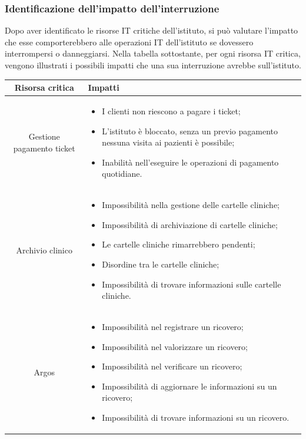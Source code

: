 \documentclass[12pt, a4paper, titlepage]{report}
\begin{document}
		\subsubsection{Identificazione dell'impatto dell'interruzione}
		
		Dopo aver identificato le risorse IT critiche dell'istituto, si può valutare l'impatto che esse comporterebbero alle operazioni IT dell'istituto se dovessero interrompersi o danneggiarsi. Nella tabella sottostante, per ogni risorsa IT critica, vengono illustrati i possibili impatti che una sua interruzione avrebbe sull'istituto.
		\newpage
		\begin{longtable}{| c | p{10cm} |}
				\hline
				\textbf{Risorsa critica} & \textbf{Impatti} \\ \hline
				Gestione pagamento ticket & \begin{itemize} \item I clienti non riescono a pagare i ticket;	\item L'istituto è bloccato, senza un previo pagamento nessuna visita ai pazienti è possibile; \item Inabilità nell'eseguire le operazioni di pagamento quotidiane.\end{itemize}\\ \hline
				Archivio clinico & \begin{itemize} \item Impossibilità nella gestione delle cartelle cliniche; \item Impossibilità di archiviazione di cartelle cliniche; \item Le cartelle cliniche rimarrebbero pendenti; \item Disordine tra le cartelle cliniche; \item Impossibilità di trovare informazioni sulle cartelle cliniche.\end{itemize}\\ \hline
				Argos & \begin{itemize}\item Impossibilità nel registrare un ricovero; \item Impossibilità nel valorizzare un ricovero; \item Impossibilità nel verificare un ricovero; \item Impossibilità di aggiornare le informazioni su un ricovero; \item Impossibilità di trovare informazioni su un ricovero.	\end{itemize}\\ \hline

\end{longtable}
\end{document}
